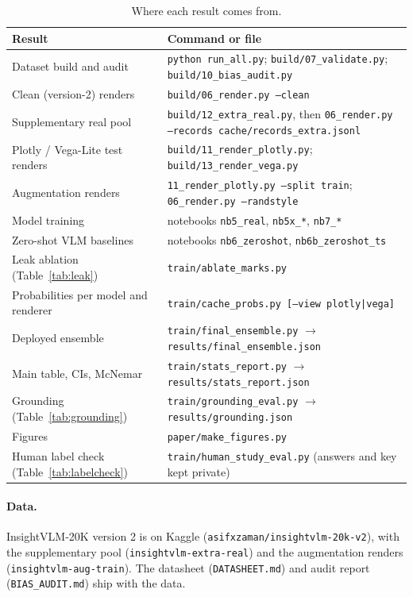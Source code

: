 \begin{table}[h]\centering\small
\caption{Where each result comes from.}
\label{tab:repro}
\begin{tabular}{p{5.2cm}p{9.0cm}}
\toprule
\textbf{Result} & \textbf{Command or file} \\
\midrule
Dataset build and audit & \texttt{python run\_all.py}; \texttt{build/07\_validate.py}; \texttt{build/10\_bias\_audit.py} \\
Clean (version-2) renders & \texttt{build/06\_render.py --clean} \\
Supplementary real pool & \texttt{build/12\_extra\_real.py}, then \texttt{06\_render.py --records cache/records\_extra.jsonl} \\
Plotly / Vega-Lite test renders & \texttt{build/11\_render\_plotly.py}; \texttt{build/13\_render\_vega.py} \\
Augmentation renders & \texttt{11\_render\_plotly.py --split train}; \texttt{06\_render.py --randstyle} \\
Model training & notebooks \texttt{nb5\_real}, \texttt{nb5x\_*}, \texttt{nb7\_*} \\
Zero-shot VLM baselines & notebooks \texttt{nb6\_zeroshot}, \texttt{nb6b\_zeroshot\_ts} \\
Leak ablation (Table~\ref{tab:leak}) & \texttt{train/ablate\_marks.py} \\
Probabilities per model and renderer & \texttt{train/cache\_probs.py [--view plotly|vega]} \\
Deployed ensemble & \texttt{train/final\_ensemble.py} $\rightarrow$ \texttt{results/final\_ensemble.json} \\
Main table, CIs, McNemar & \texttt{train/stats\_report.py} $\rightarrow$ \texttt{results/stats\_report.json} \\
Grounding (Table~\ref{tab:grounding}) & \texttt{train/grounding\_eval.py} $\rightarrow$ \texttt{results/grounding.json} \\
Figures & \texttt{paper/make\_figures.py} \\
Human label check (Table~\ref{tab:labelcheck}) & \texttt{train/human\_study\_eval.py} (answers and key kept private) \\
\bottomrule
\end{tabular}
\end{table}

\paragraph{Data.} InsightVLM-20K version 2 is on Kaggle
(\texttt{asifxzaman/insightvlm-20k-v2}), with the supplementary pool
(\texttt{insightvlm-extra-real}) and the augmentation renders
(\texttt{insightvlm-aug-train}). The datasheet (\texttt{DATASHEET.md}) and audit report
(\texttt{BIAS\_AUDIT.md}) ship with the data.
